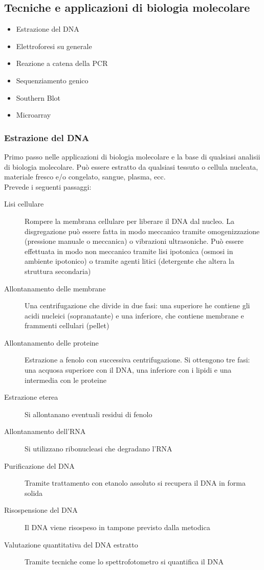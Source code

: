 \documentclass[a4paper]{article}
\begin{document}
\subsection{Tecniche e applicazioni di biologia molecolare}
\begin{itemize}
    \item Estrazione del DNA
    \item Elettroforesi su generale
    \item Reazione a catena della PCR
    \item Sequenziamento genico
    \item Southern Blot
    \item Microarray
\end{itemize}
\subsubsection{Estrazione del DNA}
Primo passo nelle applicazioni di biologia molecolare e la base di qualsiasi
analisii di biologia molecolare. Può essere estratto da qualsiasi tessuto o 
cellula nucleata, materiale fresco e/o congelato, sangue, plasma, ecc. \\
Prevede i seguenti passaggi: 
\begin{description}
    \item[Lisi cellulare] Rompere la membrana cellulare per liberare il DNA dal
    nucleo. La disgregazione può essere fatta in modo meccanico tramite 
    omogenizzazione (pressione manuale o meccanica) o vibrazioni ultrasoniche.
    Può essere effettuata in modo non meccanico tramite lisi ipotonica (osmosi
    in ambiente ipotonico) o tramite agenti litici (detergente che altera la 
    struttura secondaria)
    \item[Allontanamento delle membrane] Una centrifugazione che divide in due
    fasi: una superiore he contiene gli acidi nucleici (sopranatante) e una
    inferiore, che contiene membrane e frammenti cellulari (pellet)
    \item[Allontanamento delle proteine] Estrazione a fenolo con successiva 
    centrifugazione. Si ottengono tre fasi: una acquosa superiore con il DNA,
    una inferiore con i lipidi e una intermedia con le proteine
    \item[Estrazione eterea] Si allontanano eventuali residui di fenolo
    \item[Allontanamento dell'RNA] Si utilizzano ribonucleasi che degradano
    l'RNA
    \item[Purificazione del DNA] Tramite trattamento con etanolo assoluto si
    recupera il DNA in forma solida
    \item[Risospensione del DNA] Il DNA viene risospeso in tampone previsto 
    dalla metodica
    \item[Valutazione quantitativa del DNA estratto] Tramite tecniche come lo
    spettrofotometro si quantifica il DNA
\end{description}
\end{document}
